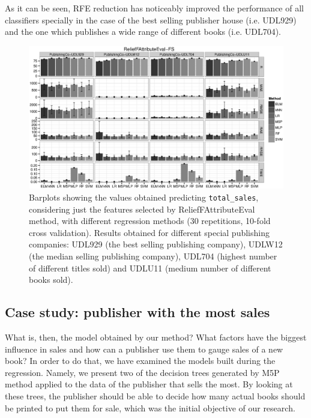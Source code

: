\documentclass[a4paper,10pt,twocolumn,preprint,3p]{elsarticle}
\begin{document}
As it can be seen, RFE reduction has noticeably improved the performance of all 
classifiers specially in the case of the best selling publisher house (i.e. UDL929) and the one which publishes a wide range of different books (i.e. UDL704). 

\begin{figure}[ht]
\begin{center}
\includegraphics[scale=0.58]{./imgs/attribute_ReliefFAttributeEval-FS.eps}
\end{center}
\caption{Barplots showing the values obtained predicting \texttt{total\_sales}, considering just the features selected by ReliefFAttributeEval method, with different regression methods (30 repetitions, 10-fold cross validation). Results obtained for different special publishing companies: UDL929 (the best selling publishing company), UDLW12 (the median selling publishing company), UDL704 (highest number of different titles sold) and UDLU11 (medium number of different books sold).
}
\label{fig:casesReliefFAttributeEval}
\end{figure}



\subsection{Case study: publisher with the most sales}
\label{subsec:decision_trees}

What is, then, the model obtained by our method? What factors have
the biggest influence in sales and how can a publisher use them to gauge
sales of a new book? In order to do that, we have examined the models
built during the regression. Namely, we present two of the decision
trees generated by M5P method applied to the data of the publisher
that sells the most. By looking at these trees, the publisher should
be able to decide how many actual books should be printed to put them
for sale, which was the initial objective of our research.
\end{document}
